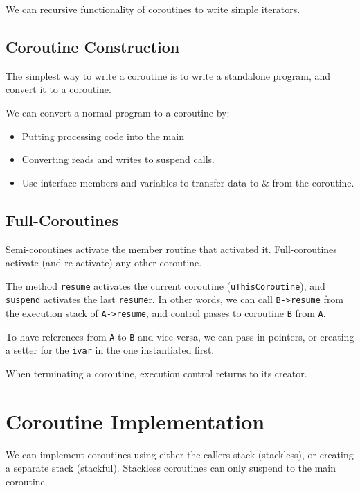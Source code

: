             We can recursive functionality of coroutines to write simple iterators.

            \subsection{Coroutine Construction} %
            \label{sub:coroutine_construction}
                The simplest way to write a coroutine is to write a standalone program, and convert it to a coroutine.

                We can convert a normal program to a coroutine by:
                \begin{itemize}
                    \item Putting processing code into the main
                    \item Converting reads and writes to suspend calls.
                    \item Use interface members and variables to transfer data to \& from the coroutine.
                \end{itemize}

            \subsection{Full-Coroutines} %
            \label{sub:full_coroutines}
                Semi-coroutines activate the member routine that activated it.
                Full-coroutines activate (and re-activate) any other coroutine.

                The method \verb|resume| activates the current coroutine (\verb|uThisCoroutine|), and \verb|suspend| activates the last \verb|resume|r.
                In other words, we can call \verb|B->resume| from the execution stack of \verb|A->resume|, and control passes to coroutine \verb|B| from \verb|A|.

                To have references from \verb|A| to \verb|B| and vice versa, we can pass in pointers, or creating a setter for the \verb|ivar| in the one instantiated first.

                When terminating a coroutine, execution control returns to its creator.

        \section{Coroutine Implementation} %
        \label{sec:coroutine_implementation}
            We can implement coroutines using either the callers stack (stackless), or creating a separate stack (stackful).
            Stackless coroutines can only suspend to the main coroutine.

